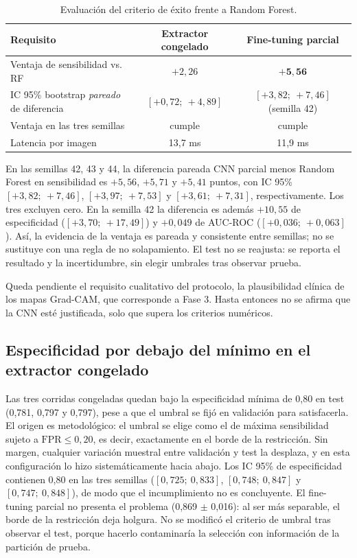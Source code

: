 \documentclass[11pt]{article}
\begin{document}
\begin{table}[h]\centering\small
\caption{Evaluación del criterio de éxito frente a Random Forest.}\label{tab:criterio}
\begin{tabular}{lcc}\toprule
Requisito & Extractor congelado & Fine-tuning parcial \\\midrule
Ventaja de sensibilidad vs. RF & $+2{,}26$ & $\mathbf{+5{,}56}$\\
IC 95\% bootstrap \emph{pareado} de diferencia & $[+0{,}72;\ +4{,}89]$ & $[+3{,}82;\ +7{,}46]$ (semilla 42)\\
Ventaja en las tres semillas & cumple & cumple\\
Latencia por imagen & 13,7 ms & 11,9 ms\\\bottomrule
\end{tabular}
\end{table}

En las semillas 42, 43 y 44, la diferencia pareada CNN parcial menos Random Forest en sensibilidad es $+5{,}56$, $+5{,}71$ y $+5{,}41$ puntos, con IC 95\% $[+3{,}82;\ +7{,}46]$, $[+3{,}97;\ +7{,}53]$ y $[+3{,}61;\ +7{,}31]$, respectivamente. Los tres excluyen cero. En la semilla 42 la diferencia es además $+10{,}55$ de especificidad ($[+3{,}70;\ +17{,}49]$) y $+0{,}049$ de AUC-ROC ($[+0{,}036;\ +0{,}063]$). Así, la evidencia de la ventaja es pareada y consistente entre semillas; no se sustituye con una regla de no solapamiento. El test no se reajusta: se reporta el resultado y la incertidumbre, sin elegir umbrales tras observar prueba.

Queda pendiente el requisito cualitativo del protocolo, la plausibilidad clínica de los mapas Grad-CAM, que corresponde a Fase 3. Hasta entonces no se afirma que la CNN esté justificada, solo que supera los criterios numéricos.

\subsection*{Especificidad por debajo del mínimo en el extractor congelado}
Las tres corridas congeladas quedan bajo la especificidad mínima de 0,80 en test (0,781, 0,797 y 0,797), pese a que el umbral se fijó en validación para satisfacerla. El origen es metodológico: el umbral se elige como el de máxima sensibilidad sujeto a $\mathrm{FPR}\leq0{,}20$, es decir, exactamente en el borde de la restricción. Sin margen, cualquier variación muestral entre validación y test la desplaza, y en esta configuración lo hizo sistemáticamente hacia abajo. Los IC 95\% de especificidad contienen 0,80 en las tres semillas ($[0{,}725;\ 0{,}833]$, $[0{,}748;\ 0{,}847]$ y $[0{,}747;\ 0{,}848]$), de modo que el incumplimiento no es concluyente. El fine-tuning parcial no presenta el problema (0,869 $\pm$ 0,016): al ser más separable, el borde de la restricción deja holgura. No se modificó el criterio de umbral tras observar el test, porque hacerlo contaminaría la selección con información de la partición de prueba.
\end{document}
